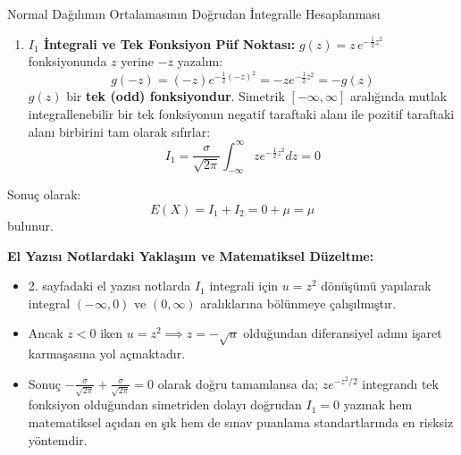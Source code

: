 \documentclass[12pt,a4paper]{article}
\begin{document}
\begin{ornek}{Normal Dağılımın Ortalamasının Doğrudan İntegralle Hesaplanması}
\begin{enumerate}
    \item \textbf{$I_1$ İntegrali ve Tek Fonksiyon Püf Noktası:}  
    $g(z) = z \, e^{-\frac{1}{2}z^2}$ fonksiyonunda $z$ yerine $-z$ yazalım:
    \begin{equation}
        g(-z) = (-z) e^{-\frac{1}{2}(-z)^2} = -z e^{-\frac{1}{2}z^2} = -g(z)
    \end{equation}
    $g(z)$ bir \textbf{tek (odd) fonksiyondur}. Simetrik $[-\infty, \infty]$ aralığında mutlak integrallenebilir bir tek fonksiyonun negatif taraftaki alanı ile pozitif taraftaki alanı birbirini tam olarak sıfırlar:
    \begin{equation}
        I_1 = \frac{\sigma}{\sqrt{2\pi}} \int_{-\infty}^{\infty} z e^{-\frac{1}{2}z^2} dz = 0
    \end{equation}
\end{enumerate}
Sonuç olarak:
\begin{equation}
    E(X) = I_1 + I_2 = 0 + \mu = \mu
\end{equation}
bulunur.
\end{ornek}

\begin{uyari}
\textbf{El Yazısı Notlardaki Yaklaşım ve Matematiksel Düzeltme:}
\begin{itemize}
    \item 2. sayfadaki el yazısı notlarda $I_1$ integrali için $u = z^2$ dönüşümü yapılarak integral $(-\infty, 0)$ ve $(0, \infty)$ aralıklarına bölünmeye çalışılmıştır.
    \item Ancak $z < 0$ iken $u = z^2 \implies z = -\sqrt{u}$ olduğundan diferansiyel adımı işaret karmaşasına yol açmaktadır.
    \item Sonuç $-\frac{\sigma}{\sqrt{2\pi}} + \frac{\sigma}{\sqrt{2\pi}} = 0$ olarak doğru tamamlansa da; $z e^{-z^2/2}$ integrandı tek fonksiyon olduğundan simetriden dolayı doğrudan $I_1 = 0$ yazmak hem matematiksel açıdan en şık hem de sınav puanlama standartlarında en risksiz yöntemdir.
\end{itemize}
\end{uyari}
\end{document}
